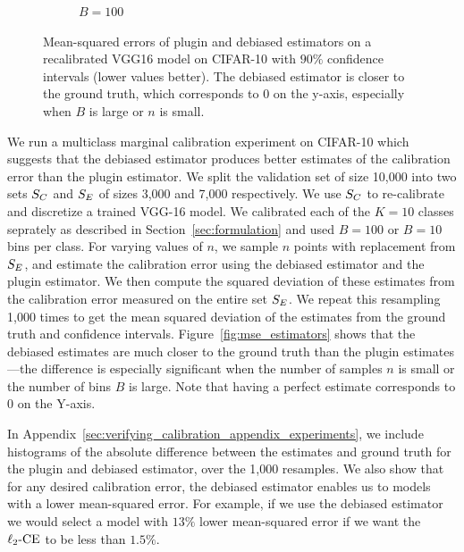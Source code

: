 \begin{figure}
\begin{subfigure}[b]{0.45\textwidth}
         \caption{$B = 100$
         }
         \label{fig:ce_vs_bins_verifying}
     \end{subfigure}
  \caption{
    Mean-squared errors of plugin and debiased estimators on a recalibrated VGG16 model on CIFAR-10 with $90\%$ confidence intervals (lower values better). The debiased estimator is closer to the ground truth, which corresponds to $0$ on the  y-axis, especially when $B$ is large or $n$ is small.
}
  \label{fig:mse_estimators_bins}
\end{figure}

We run a multiclass marginal calibration experiment on CIFAR-10 which suggests that the debiased estimator produces better estimates of the calibration error than the plugin estimator. We split the validation set of size 10,000 into two sets $S_C{}$ and $S_E{}$ of sizes 3,000 and 7,000 respectively. We use $S_C{}$ to re-calibrate and discretize a trained VGG-16 model. We calibrated  each of the $K = 10$ classes seprately as described in Section~\ref{sec:formulation} and used $B = 100$ or $B = 10$ bins per class. For varying values of $n$, we sample $n$ points with replacement from $S_E{}$, and estimate the calibration error using the debiased estimator and the plugin estimator. We then compute the squared deviation of these estimates from the calibration error measured on the entire set $S_E{}$. We repeat this resampling 1,000 times to get the mean squared deviation of the estimates from the ground truth and confidence intervals. Figure~\ref{fig:mse_estimators} shows that the debiased estimates are much closer to the ground truth than the plugin estimates---the difference is especially significant when the number of samples $n$ is small or the number of bins $B$ is large. Note that having a perfect estimate corresponds to $0$ on the  Y-axis.

In Appendix~\ref{sec:verifying_calibration_appendix_experiments}, we include histograms of the absolute difference between the estimates and ground truth for the plugin and debiased estimator, over the 1,000 resamples. We also show that for any desired calibration error, the debiased estimator enables us to   models with a lower mean-squared error. For example, if we use the debiased estimator we would select a model with $13\%$ lower mean-squared error if we want the $\ell_2\textup{-CE}$ to be less than $1.5\%$.

